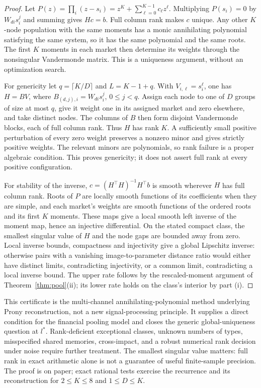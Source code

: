 \documentclass[12pt]{article}
\theoremstyle{definition}
\theoremstyle{remark}
\begin{document}
\begin{proof}
Let $P(z)=\prod_i(z-s_i)=z^K+\sum_{\ell=0}^{K-1}c_\ell z^\ell$. Multiplying $P(s_i)=0$ by $W_{di}s_i^j$ and summing gives $Hc=b$. Full column rank makes $c$ unique. Any other $K$-node population with the same moments has a monic annihilating polynomial satisfying the same system, so it has the same polynomial and the same roots. The first $K$ moments in each market then determine its weights through the nonsingular Vandermonde matrix. This is a uniqueness argument, without an optimization search.

For genericity let $q=\lceil K/D\rceil$ and $L=K-1+q$. With $V_{i,\ell}=s_i^\ell$, one has $H=BV$, where $B_{(d,j),i}=W_{di}s_i^j$, $0\le j<q$. Assign each node to one of $D$ groups of size at most $q$, give it weight one in its assigned market and zero elsewhere, and take distinct nodes. The columns of $B$ then form disjoint Vandermonde blocks, each of full column rank. Thus $H$ has rank $K$. A sufficiently small positive perturbation of every zero weight preserves a nonzero minor and gives strictly positive weights. The relevant minors are polynomials, so rank failure is a proper algebraic condition. This proves genericity; it does not assert full rank at every positive configuration.

For stability of the inverse, $c=(H^\top H)^{-1}H^\top b$ is smooth wherever $H$ has full column rank. Roots of $P$ are locally smooth functions of its coefficients when they are simple, and each market's weights are smooth functions of the ordered roots and its first $K$ moments. These maps give a local smooth left inverse of the moment map, hence an injective differential. On the stated compact class, the smallest singular value of $H$ and the node gaps are bounded away from zero. Local inverse bounds, compactness and injectivity give a global Lipschitz inverse: otherwise pairs with a vanishing image-to-parameter distance ratio would either have distinct limits, contradicting injectivity, or a common limit, contradicting a local inverse bound. The upper rate follows by the rescaled-moment argument of Theorem~\ref{thm:pool}(ii); its lower rate holds on the class's interior by part (i).
\end{proof}

This certificate is the multi-channel annihilating-polynomial method underlying Prony reconstruction, not a new signal-processing principle. It supplies a direct condition for the financial pooling model and closes the generic global-uniqueness question at $l^*$. Rank-deficient exceptional classes, unknown numbers of types, misspecified shared memories, cross-impact, and a robust numerical rank decision under noise require further treatment. The smallest singular value matters: full rank in exact arithmetic alone is not a guarantee of useful finite-sample precision. The proof is on paper; exact rational tests exercise the recurrence and its reconstruction for $2\le K\le8$ and $1\le D\le K$.
\end{document}
